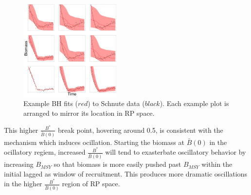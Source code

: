 %
\begin{figure} 
\vspace{-1cm}
\centering
\includegraphics[width=0.45\textwidth]{../ddBias/indexGridExpT45N300A0-1AS10K0.1.png}
\vspace{-0.45cm}
\caption{Example BH fits ($red$) to Schnute data ($black$). Each example plot is arranged to mirror its location in RP space.
}\label{bhGrid}
\end{figure}

%
This higher $\frac{B^*}{\bar B(0)}$ break point, hovering around 0.5, is 
consistent with the mechanism which induces ocillation. Starting the biomass 
at $\bar B(0)$ in the ocillatory regiem, increased $\frac{B^*}{\bar B(0)}$ 
will tend to exasterbate oscillatory behavior by increasing $B_{MSY}$ so that 
biomass is more easily pushed past $B_{MSY}$ within the initial lagged as 
window of recruitment. This produces more dramatic oscillations in the higher 
$\frac{B^*}{\bar B(0)}$ region of RP space. 

%

